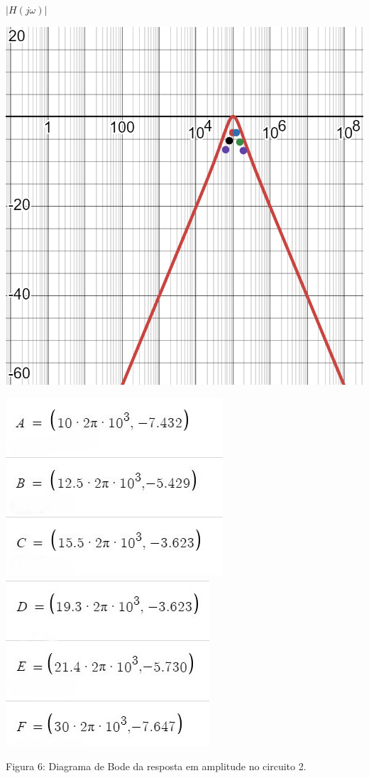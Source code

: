 \documentclass[a4 paper]{article}
\begin{document}
$|H(j\omega)|$
\begin{table}[h]
\centering
\includegraphics[scale=0.425]{figuras/bode-circ2}
\end{table}\vspace{-9.5cm}\marginpar{\textbf{$\omega$}}
\vspace{9.5cm}
\begin{table}[hb]
\centering
\includegraphics[scale=0.6]{figuras/pontosamplitude2-1}\includegraphics[scale=0.6]{figuras/pontosamplitude2}
\end{table}
\begin{center}
Figura 6: Diagrama de Bode da resposta em amplitude no circuito 2.
\end{center}
\end{document}
